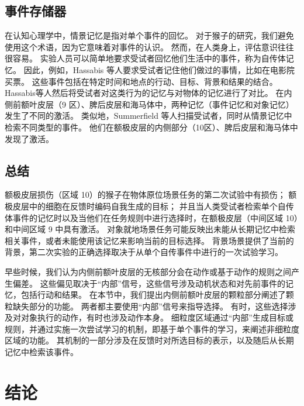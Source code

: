 \subsection{事件存储器}

在认知心理学中，情景记忆是指对单个事件的回忆。
对于猴子的研究，我们避免使用这个术语，因为它意味着对事件的认识。
然而，在人类身上，评估意识往往很容易。
实验人员可以简单地要求受试者回忆他们生活中的事件，称为自传体记忆。
因此，例如，Hassabis 等人\cite{hassabis2007using}要求受试者记住他们做过的事情，比如在电影院买票。
这些事件包括在特定时间和地点的行动、目标、背景和结果的结合。
Hassabis等人然后将受试者对这类行为的记忆与对物体的记忆进行了对比。
在内侧前额叶皮层（9 区）、脾后皮层和海马体中，两种记忆（事件记忆和对象记忆）发生了不同的激活。
类似地，Summerfield 等人\cite{summerfield2009decision}扫描受试者，同时从情景记忆中检索不同类型的事件。
他们在额极皮层的内侧部分（10区）、脾后皮层和海马体中发现了激活。\par



\subsection{总结}

额极皮层损伤（区域 10）的猴子在物体原位场景任务的第二次试验中有损伤；
额极皮层中的细胞在反馈时编码自我生成的目标；
并且当人类受试者检索单个自传体事件的记忆时以及当他们在任务规则中进行选择时，在额极皮层（中间区域 10）和中间区域 9 中具有激活。
对象就地场景任务可能反映出未能从长期记忆中检索相关事件，或者未能使用该记忆来影响当前的目标选择。
背景场景提供了当前的背景，第二次实验的正确选择取决于从单个自传事件中进行的一次试验学习。\par


早些时候，我们认为内侧前额叶皮层的无核部分会在动作或基于动作的规则之间产生偏差。
这些偏见取决于“内部”信号，这些信号涉及动机状态和对先前事件的记忆，包括行动和结果。
在本节中，我们提出内侧前额叶皮层的颗粒部分阐述了颗粒缺失部分的功能。
两者都主要使用“内部”信号来指导选择。
有时，这些选择涉及对对象执行的动作，有时也涉及动作本身。
细粒度区域通过“内部”生成目标或规则，并通过实施一次尝试学习的机制，即基于单个事件的学习，来阐述非细粒度区域的功能。
其机制的一部分涉及在反馈时对所选目标的表示，以及随后从长期记忆中检索该事件。\par



\section{结论}

